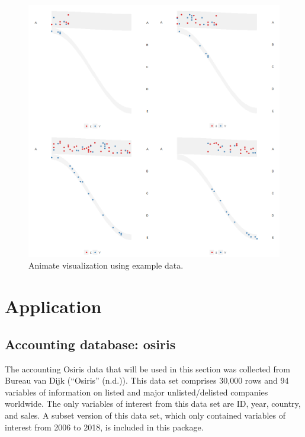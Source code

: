 \begin{figure}

{\centering \includegraphics[width=1\linewidth]{figures/animation-example} 

}

\caption{Animate visualization using example data.}\label{fig:catchange-figure}
\end{figure}

\hypertarget{application}{%
\section{Application}\label{application}}

\hypertarget{accounting-database-osiris}{%
\subsection{Accounting database: osiris}\label{accounting-database-osiris}}

The accounting Osiris data that will be used in this section was collected from Bureau van Dijk ({``Osiris''} (n.d.)). This data set comprises 30,000 rows and 94 variables of information on listed and major unlisted/delisted companies worldwide. The only variables of interest from this data set are ID, year, country, and sales. A subset version of this data set, which only contained variables of interest from 2006 to 2018, is included in this package.

